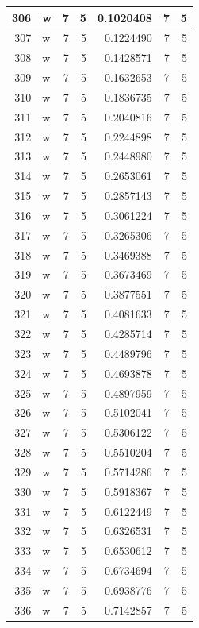 \documentclass[
  letterpaper,
  DIV=11,
  numbers=noendperiod]{scrreprt}
\begin{document}
\begin{table}
\begin{tabular}[t]{r|l|r|r|r|r|r}
\hline
306 & w & 7 & 5 & 0.1020408 & 7 & 5\\
\hline
307 & w & 7 & 5 & 0.1224490 & 7 & 5\\
\hline
308 & w & 7 & 5 & 0.1428571 & 7 & 5\\
\hline
309 & w & 7 & 5 & 0.1632653 & 7 & 5\\
\hline
310 & w & 7 & 5 & 0.1836735 & 7 & 5\\
\hline
311 & w & 7 & 5 & 0.2040816 & 7 & 5\\
\hline
312 & w & 7 & 5 & 0.2244898 & 7 & 5\\
\hline
313 & w & 7 & 5 & 0.2448980 & 7 & 5\\
\hline
314 & w & 7 & 5 & 0.2653061 & 7 & 5\\
\hline
315 & w & 7 & 5 & 0.2857143 & 7 & 5\\
\hline
316 & w & 7 & 5 & 0.3061224 & 7 & 5\\
\hline
317 & w & 7 & 5 & 0.3265306 & 7 & 5\\
\hline
318 & w & 7 & 5 & 0.3469388 & 7 & 5\\
\hline
319 & w & 7 & 5 & 0.3673469 & 7 & 5\\
\hline
320 & w & 7 & 5 & 0.3877551 & 7 & 5\\
\hline
321 & w & 7 & 5 & 0.4081633 & 7 & 5\\
\hline
322 & w & 7 & 5 & 0.4285714 & 7 & 5\\
\hline
323 & w & 7 & 5 & 0.4489796 & 7 & 5\\
\hline
324 & w & 7 & 5 & 0.4693878 & 7 & 5\\
\hline
325 & w & 7 & 5 & 0.4897959 & 7 & 5\\
\hline
326 & w & 7 & 5 & 0.5102041 & 7 & 5\\
\hline
327 & w & 7 & 5 & 0.5306122 & 7 & 5\\
\hline
328 & w & 7 & 5 & 0.5510204 & 7 & 5\\
\hline
329 & w & 7 & 5 & 0.5714286 & 7 & 5\\
\hline
330 & w & 7 & 5 & 0.5918367 & 7 & 5\\
\hline
331 & w & 7 & 5 & 0.6122449 & 7 & 5\\
\hline
332 & w & 7 & 5 & 0.6326531 & 7 & 5\\
\hline
333 & w & 7 & 5 & 0.6530612 & 7 & 5\\
\hline
334 & w & 7 & 5 & 0.6734694 & 7 & 5\\
\hline
335 & w & 7 & 5 & 0.6938776 & 7 & 5\\
\hline
336 & w & 7 & 5 & 0.7142857 & 7 & 5\\

\end{tabular}
\end{table}
\end{document}
